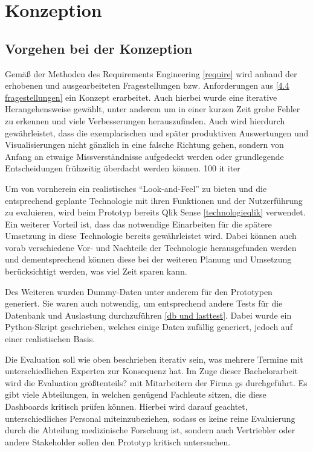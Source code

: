 \chapter{Konzeption}
\label{konzept}
\minitoc\pagebreak
\section{Vorgehen bei der Konzeption}
Gemäß der Methoden des Requirements Engineering \ref{require} wird anhand der erhobenen und ausgearbeiteten Fragestellungen bzw. Anforderungen aus \ref{4.4 fragestellungen} ein Konzept erarbeitet. Auch hierbei wurde eine iterative Herangehensweise gewählt, unter anderem um in einer kurzen Zeit grobe Fehler zu erkennen und viele Verbesserungen herauszufinden. Auch wird hierdurch gewährleistet, dass die exemplarischen und später produktiven Auswertungen und Visualisierungen nicht gänzlich in eine falsche Richtung gehen, sondern von Anfang an etwaige Missverständnisse aufgedeckt werden oder grundlegende Entscheidungen frühzeitig überdacht werden können.
 {100} {it} {iter}

Um von vornherein ein realistisches "`Look-and-Feel"' zu bieten und die entsprechend geplante Technologie mit ihren Funktionen und der Nutzerführung zu evaluieren, wird beim Prototyp bereits Qlik Sense \ref{technologieqlik} verwendet. Ein weiterer Vorteil ist, dass das notwendige Einarbeiten für die spätere Umsetzung in diese Technologie bereits gewährleistet wird. Dabei können auch vorab verschiedene Vor- und Nachteile der Technologie herausgefunden werden und dementsprechend können diese bei der weiteren Planung und Umsetzung berücksichtigt werden, was viel Zeit sparen kann.

Des Weiteren wurden Dummy-Daten unter anderem für den Prototypen generiert. Sie waren auch notwendig, um entsprechend andere Tests für die Datenbank und Auslastung durchzuführen \ref{db und lasttest}. Dabei wurde ein Python-Skript geschrieben, welches einige Daten zufällig generiert, jedoch auf einer realistischen Basis.

Die Evaluation soll wie oben beschrieben iterativ sein, was mehrere Termine mit unterschiedlichen Experten zur Konsequenz hat. Im Zuge dieser Bachelorarbeit wird die Evaluation größtenteils? mit Mitarbeitern der Firma gs durchgeführt. Es gibt viele Abteilungen, in welchen genügend Fachleute sitzen, die diese Dashboards kritisch prüfen können. Hierbei wird darauf geachtet, unterschiedliches Personal miteinzubeziehen, sodass es keine reine Evaluierung durch die Abteilung medizinische Forschung ist, sondern auch Vertriebler oder andere Stakeholder sollen den Prototyp kritisch untersuchen.

